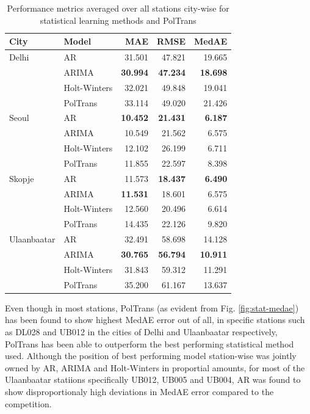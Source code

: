 \documentclass[10pt,journal]{IEEEtran}
\begin{document}
\begin{table}[h]
\small
\centering
\tabcolsep=0.16cm
\caption{Performance metrics averaged over all stations city-wise for statistical learning methods and PolTrans}
\label{tbl:stat-performance}
\begin{tabular}{llrrr}
\toprule
City & Model &   MAE &    RMSE &   MedAE \\
\midrule
Delhi & AR &  31.501 &  47.821 &  19.665 \\
            & ARIMA &  \textbf{30.994} &  \textbf{47.234} &  \textbf{18.698} \\
            & Holt-Winters &  32.021 &  49.848 &  19.041 \\
            & PolTrans &  33.114 &  49.020 &  21.426 \\
Seoul & AR &  \textbf{10.452} &  \textbf{21.431} &   \textbf{6.187} \\
            & ARIMA &  10.549 &  21.562 &   6.575 \\
            & Holt-Winters &  12.102 &  26.199 &   6.711 \\
            & PolTrans &  11.855 &  22.597 &   8.398 \\
Skopje & AR &  11.573 &  \textbf{18.437} &   \textbf{6.490} \\
            & ARIMA &  \textbf{11.531} &  18.601 &   6.575 \\
            & Holt-Winters &  12.560 &  20.496 &   6.614 \\
            & PolTrans &  14.435 &  22.126 &   9.820 \\
Ulaanbaatar & AR &  32.491 &  58.698 &  14.128 \\
            & ARIMA &  \textbf{30.765} &  \textbf{56.794} &  \textbf{10.911} \\
            & Holt-Winters &  31.843 &  59.312 &  11.291 \\
            & PolTrans &  35.200 &  61.167 &  13.637 \\
\bottomrule
\end{tabular}
\end{table}

Even though in most stations, {PolTrans} (as evident from Fig. \ref{fig:stat-medae}) has been found to show highest MedAE error out of all, in specific stations such as DL028 and UB012 in the cities of Delhi and Ulaanbaatar respectively, {PolTrans}  has been able to outperform the best performing statistical method used. Although the position of best performing model station-wise was jointly owned by AR, ARIMA and Holt-Winters in proportial amounts,  for most of the Ulaanbaatar statiions specifically UB012, UB005 and UB004, AR was found to show disproportionaly high deviations in MedAE error compared to the competition.
\end{document}
